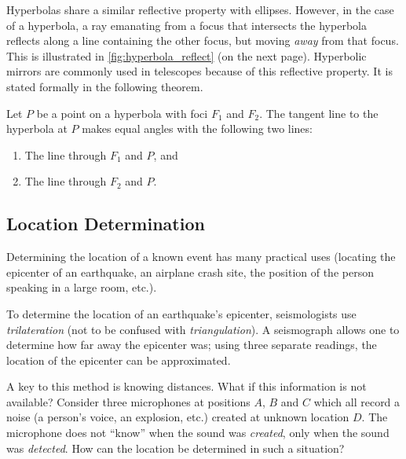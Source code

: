 {Hyperbolas share a similar reflective property with ellipses. However, in the case of a hyperbola, a ray emanating from a focus that intersects the hyperbola reflects along a line containing the other focus, but moving \emph{away} from that focus. This is illustrated in \autoref{fig:hyperbola_reflect} (on the next page). Hyperbolic mirrors are commonly used in telescopes because of this reflective property. It is stated formally in the following theorem.

\begin{theorem}\label{thm:reflective_hyperbola}%
Let $P$ be a point on a hyperbola with foci $F_1$ and $F_2$. The tangent line to the hyperbola at $P$ makes equal angles with the following two lines:
\begin{enumerate}
	\item	The line through $F_1$ and $P$, and
	\item	The line through $F_2$ and $P$.
\end{enumerate}
\end{theorem}

\subsection{Location Determination}

Determining the location of a known event has many practical uses (locating the epicenter of an earthquake, an airplane crash site, the position of the person speaking in a large room, etc.).

To determine the location of an earthquake's epicenter, seismologists use \emph{trilateration} (not to be confused with \emph{triangulation}). A seismograph allows one to determine how far away the epicenter was; using three separate readings, the location of the epicenter can be approximated.

A key to this method is knowing distances. What if this information is not available? Consider three microphones at positions $A$, $B$ and $C$ which all record a noise (a person's voice, an explosion, etc.) created at unknown location $D$. The microphone does not ``know'' when the sound was \emph{created}, only when the sound was \emph{detected}. How can the location be determined in such a situation?

}
